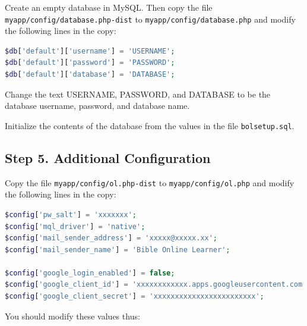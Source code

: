 \documentclass[11pt,oneside,a4paper]{memoir}
\begin{document}
Create an empty database in MySQL. Then copy the file
\texttt{myapp/config/database.php-dist} to \texttt{myapp/config/database.php} and modify the
following lines in the copy:

\begin{lstlisting}[language=PHP]
$db['default']['username'] = 'USERNAME';
$db['default']['password'] = 'PASSWORD';
$db['default']['database'] = 'DATABASE';
\end{lstlisting}

Change the text USERNAME, PASSWORD, and DATABASE to be the database username, password, and database
name.

Initialize the contents of the database from the values in the file \texttt{bolsetup.sql}.


\subsection{Step 5. Additional Configuration}

Copy the file \texttt{myapp/config/ol.php-dist} to \texttt{myapp/config/ol.php} and modify the
following lines in the copy:

\begin{lstlisting}[language=PHP]
$config['pw_salt'] = 'xxxxxxx';
$config['mql_driver'] = 'native';
$config['mail_sender_address'] = 'xxxxx@xxxxx.xx';
$config['mail_sender_name'] = 'Bible Online Learner';

$config['google_login_enabled'] = false;
$config['google_client_id'] = 'xxxxxxxxxxxx.apps.googleusercontent.com';
$config['google_client_secret'] = 'xxxxxxxxxxxxxxxxxxxxxxxx';
\end{lstlisting}

You should modify these values thus:
\end{document}

